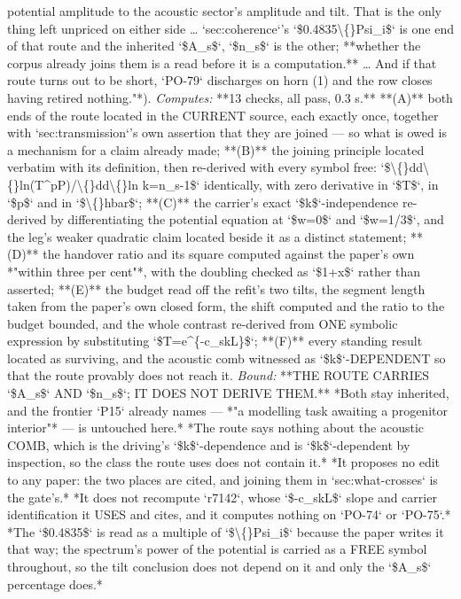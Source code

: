 \begin{description}
potential amplitude to the acoustic sector's amplitude and tilt. That is the only thing left unpriced on either side \ldots{} `sec:coherence`'s `\$0.4835\textbackslash\{\}Psi\_i\$` is one end of that route and the inherited `\$A\_s\$`, `\$n\_s\$` is the other; **whether the corpus already joins them is a read before it is a computation.** \ldots{} And if that route turns out to be short, `PO-79` discharges on horn (1) and the row closes having retired nothing."*). 
\emph{Computes:} **13 checks, all pass, 0.3 s.** **(A)** both ends of the route located in the CURRENT source, each exactly once, together with `sec:transmission`'s own assertion that they are joined --- so what is owed is a mechanism for a claim already made; **(B)** the joining principle located verbatim with its definition, then re-derived with every symbol free: `\$\textbackslash\{\}dd\textbackslash\{\}ln(T\textasciicircum{}pP)/\textbackslash\{\}dd\textbackslash\{\}ln k=n\_s-1\$` identically, with zero derivative in `\$T\$`, in `\$p\$` and in `\$\textbackslash\{\}hbar\$`; **(C)** the carrier's exact `\$k\$`-independence re-derived by differentiating the potential equation at `\$w=0\$` and `\$w=1/3\$`, and the leg's weaker quadratic claim located beside it as a distinct statement; **(D)** the handover ratio and its square computed against the paper's own *"within three per cent"*, with the doubling checked as `\$1+x\$` rather than asserted; **(E)** the budget read off the refit's two tilts, the segment length taken from the paper's own closed form, the shift computed and the ratio to the budget bounded, and the whole contrast re-derived from ONE symbolic expression by substituting `\$T=e\textasciicircum{}\{-c\_skL\}\$`; **(F)** every standing result located as surviving, and the acoustic comb witnessed as `\$k\$`-DEPENDENT so that the route provably does not reach it.
 \emph{Bound:}  **THE ROUTE CARRIES `\$A\_s\$` AND `\$n\_s\$`; IT DOES NOT DERIVE THEM.**  *Both stay inherited, and the frontier `P15` already names --- *"a modelling task awaiting a progenitor interior"* --- is untouched here.*  *The route says nothing about the acoustic COMB, which is the driving's `\$k\$`-dependence and is `\$k\$`-dependent by inspection, so the class the route uses does not contain it.*  *It proposes no edit to any paper: the two places are cited, and joining them in `sec:what-crosses` is the gate's.*  *It does not recompute `r7142`, whose `\$-c\_skL\$` slope and carrier identification it USES and cites, and it computes nothing on `PO-74` or `PO-75`.*  *The `\$0.4835\$` is read as a multiple of `\$\textbackslash\{\}Psi\_i\$` because the paper writes it that way; the spectrum's power of the potential is carried as a FREE symbol throughout, so the tilt conclusion does not depend on it and only the `\$A\_s\$` percentage does.*

\end{description}

